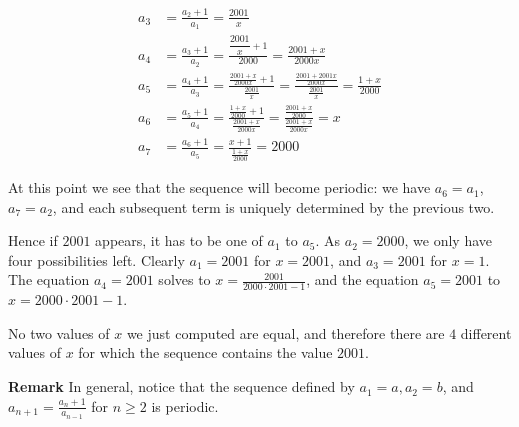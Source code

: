 \begin{enumerate}
 
 \begin{align*} a_3  & = \frac{a_2+1}{a_1} = \frac{2001}x \\ a_4  & = \frac{a_3+1}{a_2} = \frac{ \dfrac{2001}x + 1 }{ 2000 } = \frac{2001 + x}{2000x} \\ a_5 & = \frac{a_4+1}{a_3} = \frac{ \frac{2001 + x}{2000x} + 1 }{ \frac{2001}x } = \frac{ \frac{2001 + 2001x}{2000x} }{ \frac{2001}x } = \frac{1+x}{2000} \\ a_6 & = \frac{a_5+1}{a_4} = \frac{ \frac{1+x}{2000} + 1 }{ \frac{2001 + x}{2000x} } =  \frac{ \frac{2001+x}{2000} }{ \frac{2001 + x}{2000x} } = x \\ a_7 & = \frac{a_6+1}{a_5} = \frac{ x+1 }{ \frac{1+x}{2000} } = 2000 \end{align*}


 At this point we see that the sequence will become periodic: we have $a_6=a_1$, $a_7=a_2$, and each subsequent term is uniquely determined by the previous two.

 Hence if $2001$ appears, it has to be one of $a_1$ to $a_5$. As $a_2=2000$, we only have four possibilities left. Clearly $a_1=2001$ for $x=2001$, and $a_3=2001$ for $x=1$. The equation $a_4=2001$ solves to $x = \frac{2001}{2000\cdot 2001 - 1}$, and the equation $a_5=2001$ to $x=2000\cdot 2001 - 1$.

 No two values of $x$ we just computed are equal, and therefore there are $\boxed{4}$ different values of $x$ for which the sequence contains the value $2001$.

 \textbf{Remark} In general, notice that the sequence defined by $a_1=a, a_2=b$, and $a_{n+1} = \frac{a_n +1}{a_{n-1}}$ for $n\ge 2$ is periodic.

 


\end{enumerate}
